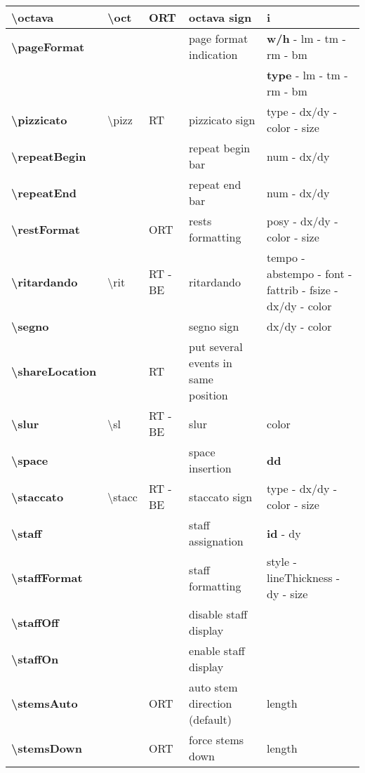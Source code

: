 \documentclass[a4paper, landscape, 10pt]{article}
\begin{document}
\begin{tabularx}{\linewidth}{p{3cm}p{4.5cm}p{3cm}p{5.5cm}l}
    \hline
    \textbf{\textbackslash{}octava}&\textbackslash{}oct&ORT&octava sign&\textbf{i}\\
    \hline
    \textbf{\textbackslash{}pageFormat}&&&page format indication&\textbf{w/h} - lm - tm - rm - bm\\
    &&&&\textbf{type} - lm - tm - rm - bm\\
    \hline
    \textbf{\textbackslash{}pizzicato}&\textbackslash{}pizz&RT&pizzicato sign&type - dx/dy - color - size\\
    \hline
    \textbf{\textbackslash{}repeatBegin}&&&repeat begin bar&num - dx/dy\\
    \hline
    \textbf{\textbackslash{}repeatEnd}&&&repeat end bar&num - dx/dy\\
    \hline
    \textbf{\textbackslash{}restFormat}&&ORT&rests formatting&posy - dx/dy - color - size\\
    \hline
    \textbf{\textbackslash{}ritardando}&\textbackslash{}rit&RT - BE&ritardando&tempo - abstempo - font - fattrib - fsize - dx/dy - color\\
    \hline
    \textbf{\textbackslash{}segno}&&&segno sign&dx/dy - color\\
    \hline
    \textbf{\textbackslash{}shareLocation}&&RT&put several events in same position&\\
    \hline
    \textbf{\textbackslash{}slur}&\textbackslash{}sl&RT - BE&slur&color\\
    \hline
    \textbf{\textbackslash{}space}&&&space insertion&\textbf{dd}\\
    \hline
    \textbf{\textbackslash{}staccato}&\textbackslash{}stacc&RT - BE&staccato sign&type - dx/dy - color - size\\
    \hline
    \textbf{\textbackslash{}staff}&&&staff assignation&\textbf{id} - dy\\
    \hline
    \textbf{\textbackslash{}staffFormat}&&&staff formatting&style - lineThickness - dy - size\\
    \hline
    \textbf{\textbackslash{}staffOff}&&&disable staff display&\\
    \hline
    \textbf{\textbackslash{}staffOn}&&&enable staff display&\\
    \hline
    \textbf{\textbackslash{}stemsAuto}&&ORT&auto stem direction (default)&length\\
    \hline
    \textbf{\textbackslash{}stemsDown}&&ORT&force stems down&length\\

\end{tabularx}
\end{document}
